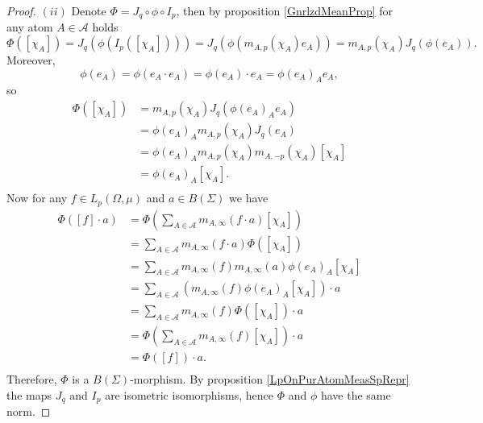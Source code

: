 \documentclass[12pt]{article}
\begin{document}
\begin{proof}
    $(ii)$ Denote $\Phi=J_q\circ \phi\circ I_p$, then by 
    proposition \ref{GnrlzdMeanProp} for any atom $A\in\mathcal{A}$ holds
    \[
        \Phi([\chi_A])
        =J_q(\phi(I_p([\chi_A])))
        =J_q(\phi(m_{A,p}(\chi_A)e_A))
        =m_{A,p}(\chi_A)J_q(\phi(e_A)).
    \]
    Moreover,
    \[
        \phi(e_A)
        =\phi(e_A\cdot e_A)
        =\phi(e_A)\cdot e_A
        =\phi(e_A)_A e_A,
    \]
    so
    \[
    \begin{aligned}
        \Phi([\chi_A])
        &=m_{A,p}(\chi_A)J_q(\phi(e_A)_A e_A) \\
        &=\phi(e_A)_A m_{A,p}(\chi_A)J_q( e_A) \\
        &=\phi(e_A)_A m_{A,p}(\chi_A)m_{A,-p}(\chi_A) [\chi_A] \\
        &=\phi(e_A)_A [\chi_A]. \\
    \end{aligned}
    \]
    Now for any $f\in L_p(\Omega, \mu)$ and $a\in B(\Sigma)$ we have
    \[
    \begin{aligned}
        \Phi([f]\cdot a)
        &=\Phi\left(
            \sum_{A\in\mathcal{A}} m_{A,\infty}(f\cdot a)[\chi_A]
        \right) \\
        &=\sum_{A\in\mathcal{A}} m_{A,\infty}(f\cdot a) \Phi([\chi_A])\\
        &=\sum_{A\in\mathcal{A}} 
            m_{A,\infty}(f) m_{A,\infty}(a) \phi(e_A)_A [\chi_A] \\
        &=\sum_{A\in\mathcal{A}} 
            (m_{A,\infty}(f) \phi(e_A)_A [\chi_A])\cdot a \\
        &=\sum_{A\in\mathcal{A}} 
            m_{A,\infty}(f) \Phi([\chi_A])\cdot a \\
        &=\Phi\left(\sum_{A\in\mathcal{A}} 
            m_{A,\infty}(f) [\chi_A]\right)\cdot a \\
        &=\Phi([f])\cdot a. \\
    \end{aligned}
    \]
    Therefore, $\Phi$ is a $B(\Sigma)$-morphism. By 
    proposition \ref{LpOnPurAtomMeasSpRepr} the maps $J_q$ and $I_p$ are 
    isometric isomorphisms, hence $\Phi$ and $\phi$ have the same norm.
\end{proof}
\end{document}
